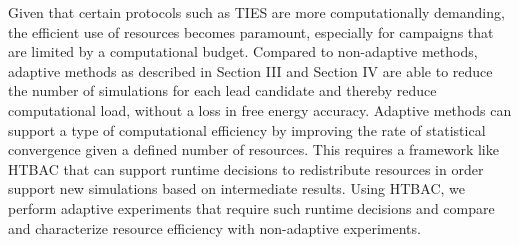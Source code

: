 Given that certain protocols such as TIES are more computationally demanding, 
the efficient use of resources becomes paramount, especially for campaigns that 
are limited by a computational budget. Compared to non-adaptive 
methods, adaptive methods as described in Section III and Section IV are able to 
reduce the number of simulations for each lead candidate and thereby reduce
computational load, without a loss in free energy accuracy. Adaptive methods 
can support a type of computational efficiency by improving the rate of 
statistical convergence given a defined number of resources. This requires 
a framework like HTBAC that can support runtime decisions to redistribute 
resources in order support new simulations based on intermediate results. Using 
HTBAC, we perform adaptive experiments that require such runtime decisions and 
compare and characterize resource efficiency with non-adaptive experiments. 






